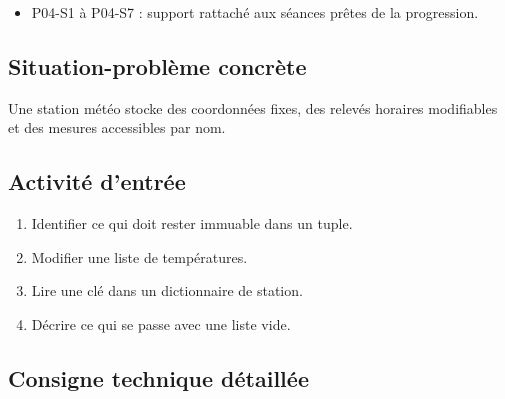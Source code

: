 \begin{itemize}
\tightlist
\item
  P04-S1 à P04-S7 : support rattaché aux séances prêtes de la
  progression.
\end{itemize}

\subsection{Situation-problème concrète}

Une station météo stocke des coordonnées fixes, des relevés horaires
modifiables et des mesures accessibles par nom.

\subsection{Activité d’entrée}

\begin{enumerate}
\def\labelenumi{\arabic{enumi}.}
\tightlist
\item
  Identifier ce qui doit rester immuable dans un tuple.
\item
  Modifier une liste de températures.
\item
  Lire une clé dans un dictionnaire de station.
\item
  Décrire ce qui se passe avec une liste vide.
\end{enumerate}

\subsection{Consigne technique détaillée}

